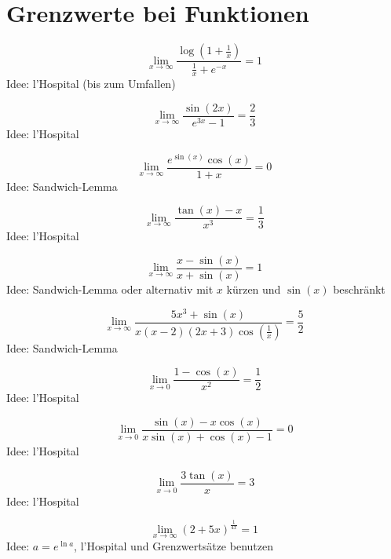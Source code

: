 \section{Grenzwerte bei Funktionen}
\begin{displaymath}
  \lim_{x \to \infty} \frac{\log\left(1 + \frac{1}{x}\right)}{\frac{1}{x} + e^{-x}} = 1
\end{displaymath}
Idee: l'Hospital (bis zum Umfallen)

\begin{displaymath}
  \lim_{x \to \infty} \frac{\sin(2x)}{e^{3x} - 1} = \frac{2}{3}
\end{displaymath}
Idee: l'Hospital

\begin{displaymath}
  \lim_{x \to \infty} \frac{e^{\sin(x)}\cos(x)}{1+x} = 0
\end{displaymath}
Idee: Sandwich-Lemma

\begin{displaymath}
  \lim_{x \to \infty} \frac{\tan(x)-x}{x^3} = \frac{1}{3}
\end{displaymath}
Idee: l'Hospital

\begin{displaymath}
  \lim_{x \to \infty} \frac{x-\sin(x)}{x + \sin(x)} = 1
\end{displaymath}
Idee: Sandwich-Lemma oder alternativ mit $x$ kürzen und $\sin(x)$ beschränkt

\begin{displaymath}
  \lim_{x \to \infty} \frac{5x^3 +\sin(x)}{x(x-2)(2x+3)\cos\left(\frac{1}{x}\right)} = \frac{5}{2}
\end{displaymath}
Idee: Sandwich-Lemma

\begin{displaymath}
  \lim_{x \to 0} \frac{1 - \cos(x)}{x^2} = \frac{1}{2}
\end{displaymath}
Idee: l'Hospital

\begin{displaymath}
  \lim_{x \to 0} \frac{\sin(x) - x\cos(x)}{x\sin(x)+\cos(x) - 1} = 0
\end{displaymath}
Idee: l'Hospital

\begin{displaymath}
  \lim_{x \to 0} \frac{3 \tan(x)}{x} = 3
\end{displaymath}
Idee: l'Hospital

\begin{displaymath}
  \lim_{x \to \infty} \left(2+5x\right)^{\frac{1}{4x}} = 1
\end{displaymath}
Idee: $a = e^{\ln a}$, l'Hospital und Grenzwertsätze benutzen

